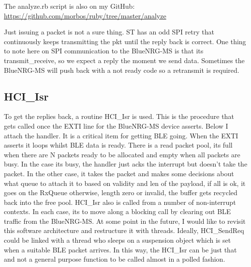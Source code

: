 \documentclass[11pt]{article}
\numberwithin{figure}{section}
\begin{document}
The analyze.rb script
is also on my GitHub:
\url{https://github.com/morbos/ruby/tree/master/analyze}

Just issuing a packet is not a sure thing. ST has an odd SPI retry
that continuously keeps transmitting the pkt until the reply back is
correct. One thing to note here on SPI communication to the BlueNRG-MS
is that its transmit\_receive, so we expect a reply the moment we send
data. Sometimes the BlueNRG-MS will push back with a not ready code so
a retransmit is required.

{
\selectfont

}
\subsection{HCI\_Isr}
To get the replies back, a routine HCI\_Isr is used. This is the
procedure that gets called once the EXTI line for the BlueNRG-MS
device asserts. Below I attach the handler. It is a critical item for
getting BLE going. When the EXTI asserts it loops whilst BLE data is
ready. There is a read packet pool, its full when there are N packets
ready to be allocated and empty when all packets are busy. In the case
its busy, the handler just acks the interrupt but doesn't take the
packet. In the other case, it takes the packet and makes some
decisions about what queue to attach it to based on validity and len
of the payload, if all is ok, it goes on the RxQueue otherwise, length
zero or invalid, the buffer gets recycled back into the free pool. HCI\_Isr
also is called from a number of non-interrupt contexts. In each case,
its to move along a blocking call by clearing out BLE traffic from the
BlueNRG-MS. At some point in the future, I would like to revisit this
software architecture and restructure it with threads. Ideally,
HCI\_SendReq could be linked with a thread who sleeps on a suspension
object which is set when a suitable BLE packet arrives. In this way,
the HCI\_Isr can be just that and not a general purpose function to be
called almost in a polled fashion.

{
\selectfont

}
\end{document}

